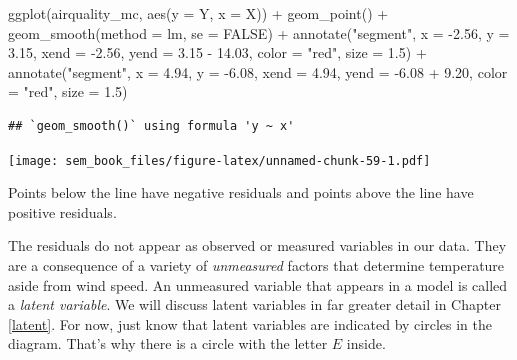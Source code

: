 \documentclass[
]{book}
\newenvironment{Shaded}{\begin{snugshade}}{\end{snugshade}}
\newcommand{\AttributeTok}[1]{\textcolor[rgb]{0.77,0.63,0.00}{#1}}
\newcommand{\ConstantTok}[1]{\textcolor[rgb]{0.00,0.00,0.00}{#1}}
\newcommand{\FloatTok}[1]{\textcolor[rgb]{0.00,0.00,0.81}{#1}}
\newcommand{\FunctionTok}[1]{\textcolor[rgb]{0.00,0.00,0.00}{#1}}
\newcommand{\NormalTok}[1]{#1}
\newcommand{\SpecialCharTok}[1]{\textcolor[rgb]{0.00,0.00,0.00}{#1}}
\newcommand{\StringTok}[1]{\textcolor[rgb]{0.31,0.60,0.02}{#1}}
\begin{document}
\begin{Shaded}
\begin{Highlighting}[]
\FunctionTok{ggplot}\NormalTok{(airquality\_mc, }\FunctionTok{aes}\NormalTok{(}\AttributeTok{y =}\NormalTok{ Y, }\AttributeTok{x =}\NormalTok{ X)) }\SpecialCharTok{+}
    \FunctionTok{geom\_point}\NormalTok{() }\SpecialCharTok{+}
    \FunctionTok{geom\_smooth}\NormalTok{(}\AttributeTok{method =}\NormalTok{ lm, }\AttributeTok{se =} \ConstantTok{FALSE}\NormalTok{) }\SpecialCharTok{+}
    \FunctionTok{annotate}\NormalTok{(}\StringTok{"segment"}\NormalTok{,}
             \AttributeTok{x =} \SpecialCharTok{{-}}\FloatTok{2.56}\NormalTok{, }\AttributeTok{y =} \FloatTok{3.15}\NormalTok{,}
             \AttributeTok{xend =} \SpecialCharTok{{-}}\FloatTok{2.56}\NormalTok{, }\AttributeTok{yend =} \FloatTok{3.15} \SpecialCharTok{{-}} \FloatTok{14.03}\NormalTok{,}
             \AttributeTok{color =} \StringTok{"red"}\NormalTok{, }\AttributeTok{size =} \FloatTok{1.5}\NormalTok{) }\SpecialCharTok{+}
    \FunctionTok{annotate}\NormalTok{(}\StringTok{"segment"}\NormalTok{,}
             \AttributeTok{x =} \FloatTok{4.94}\NormalTok{, }\AttributeTok{y =} \SpecialCharTok{{-}}\FloatTok{6.08}\NormalTok{,}
             \AttributeTok{xend =} \FloatTok{4.94}\NormalTok{, }\AttributeTok{yend =} \SpecialCharTok{{-}}\FloatTok{6.08} \SpecialCharTok{+} \FloatTok{9.20}\NormalTok{,}
             \AttributeTok{color =} \StringTok{"red"}\NormalTok{, }\AttributeTok{size =} \FloatTok{1.5}\NormalTok{)}
\end{Highlighting}
\end{Shaded}

\begin{verbatim}
## `geom_smooth()` using formula 'y ~ x'
\end{verbatim}

\texttt{[image: sem\_book\_files/figure-latex/unnamed-chunk-59-1.pdf]}

Points below the line have negative residuals and points above the line have positive residuals.

The residuals do not appear as observed or measured variables in our data. They are a consequence of a variety of \emph{unmeasured} factors that determine temperature aside from wind speed. An unmeasured variable that appears in a model is called a \emph{latent variable}. We will discuss latent variables in far greater detail in Chapter \ref{latent}. For now, just know that latent variables are indicated by circles in the diagram. That's why there is a circle with the letter \(E\) inside.
\end{document}

